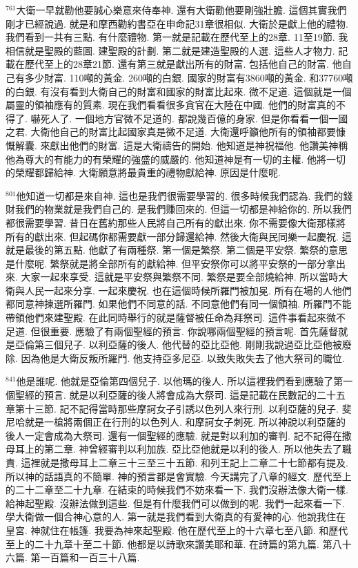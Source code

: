 \documentclass{book}
\begin{document}
$^{761}$大衛一早就勸他要誠心樂意來侍奉神.
還有大衛勸他要剛強壯膽.
這個其實我們剛才已經說過.
就是和摩西勸約書亞在申命記31章很相似.
大衛於是獻上他的禮物.
我們看到一共有三點.
有什麼禮物.
第一就是記載在歷代至上的28章.
11至19節.
我相信就是聖殿的藍圖.
建聖殿的計劃.
第二就是建造聖殿的人選.
這些人才物力.
記載在歷代至上的28章21節.
還有第三就是獻出所有的財富.
包括他自己的財富.
他自己有多少財富.
110噸的黃金.
260噸的白銀.
國家的財富有3860噸的黃金.
和37760噸的白銀.
有沒有看到大衛自己的財富和國家的財富比起來.
微不足道.
這個就是一個屬靈的領袖應有的質素.
現在我們看看很多貪官在大陸在中國.
他們的財富真的不得了.
嚇死人了.
一個地方官微不足道的.
都說幾百億的身家.
但是你看看一個一國之君.
大衛他自己的財富比起國家真是微不足道.
大衛還呼籲他所有的領袖都要慷慨解囊.
來獻出他們的財富.
這是大衛禱告的開始.
他知道是神祝福他.
他讚美神稱他為尊大的有能力的有榮耀的強盛的威嚴的.
他知道神是有一切的主權.
他將一切的榮耀都歸給神.
大衛願意將最貴重的禮物獻給神.
原因是什麼呢.

$^{801}$他知道一切都是來自神.
這也是我們很需要學習的.
很多時候我們認為.
我們的錢財我們的物業就是我們自己的.
是我們賺回來的.
但這一切都是神給你的.
所以我們都很需要學習.
昔日在舊約那些人民將自己所有的獻出來.
你不需要像大衛那樣將所有的獻出來.
但起碼你都需要獻一部分歸還給神.
然後大衛與民同樂一起慶祝.
這就是最後的第五點.
他獻了有兩種祭.
第一個是繁祭.
第二個是平安祭.
繁祭的意思是什麼呢.
繁祭就是將全部所有的獻給神.
但平安祭你可以將平安祭的一部分拿出來.
大家一起來享受.
這就是平安祭與繁祭不同.
繁祭是要全部燒給神.
所以當時大衛與人民一起來分享.
一起來慶祝.
也在這個時候所羅門被加冕.
所有在場的人他們都同意神揀選所羅門.
如果他們不同意的話.
不同意他們有同一個領袖.
所羅門不能帶領他們來建聖殿.
在此同時舉行的就是薩督被任命為拜祭司.
這件事看起來微不足道.
但很重要.
應驗了有兩個聖經的預言.
你說哪兩個聖經的預言呢.
首先薩督就是亞倫第三個兒子.
以利亞薩的後人.
他代替的亞比亞他.
剛剛我說過亞比亞他被廢除.
因為他是大衛反叛所羅門.
他支持亞多尼亞.
以致失敗失去了他大祭司的職位.

$^{841}$他是誰呢.
他就是亞倫第四個兒子.
以他瑪的後人.
所以這裡我們看到應驗了第一個聖經的預言.
就是以利亞薩的後人將會成為大祭司.
這是記載在民數記的二十五章第十三節.
記不記得當時那些摩訶女子引誘以色列人來行刑.
以利亞薩的兒子.
斐尼哈就是一槍將兩個正在行刑的以色列人.
和摩訶女子刺死.
所以神說以利亞薩的後人一定會成為大祭司.
還有一個聖經的應驗.
就是對以利加的審判.
記不記得在撒母耳上的第二章.
神曾經審判以利加族.
亞比亞他就是以利的後人.
所以他失去了職責.
這裡就是撒母耳上二章三十三至三十五節.
和列王記上二章二十七節都有提及.
所以神的話語真的不簡單.
神的預言都是會實驗.
今天講完了八章的經文.
歷代至上的二十二章至二十九章.
在結束的時候我們不妨來看一下.
我們沒辦法像大衛一樣.
給神起聖殿.
沒辦法做到這些.
但是有什麼我們可以做到的呢.
我們一起來看一下.
學大衛做一個合神心意的人.
第一就是我們看到大衛真的有愛神的心.
他說我住在皇宮.
神就住在帳篷.
我要為神來起聖殿.
他在歷代至上的十六章七至八節.
和歷代至上的二十九章十至二十節.
他都是以詩歌來讚美耶和華.
在詩篇的第九篇.
第八十六篇.
第一百篇和一百三十八篇.
\end{document}
